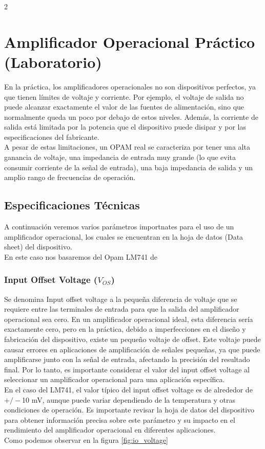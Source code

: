 \documentclass{article}
\begin{document}
\begin{multicols}{2}
 
\section{Amplificador Operacional Práctico (Laboratorio)}
En la práctica, los amplificadores operacionales no son dispositivos perfectos, ya que tienen límites de voltaje y corriente.
Por ejemplo, el voltaje de salida no puede alcanzar exactamente el valor de las fuentes de alimentación, sino que normalmente queda un poco por debajo de estos niveles.
Además, la corriente de salida está limitada por la potencia que el dispositivo puede disipar y por las especificaciones del fabricante.\\
A pesar de estas limitaciones, un OPAM real se caracteriza por tener una alta ganancia de voltaje, una impedancia de entrada muy grande (lo que evita consumir corriente de la señal de entrada), una baja impedancia de salida y un amplio rango de frecuencias de operación.



\subsection{Especificaciones Técnicas}
A continuación veremos varios parámetros importnates para el uso de un amplificador operacional, los cuales se encuentran en la hoja de datos (Data sheet) del dispositivo.\\
En este caso nos basaremos del Opam LM741 de 


\subsubsection{Input Offset Voltage ($V_{OS}$)}

Se denomina Input offset voltage a la pequeña diferencia de voltaje que se requiere entre las terminales de entrada para que la salida del amplificador operacional sea cero. En un amplificador operacional ideal, esta diferencia sería exactamente cero, pero en la práctica, debido a imperfecciones en el diseño y fabricación del dispositivo, existe un pequeño voltaje de offset. Este voltaje puede causar errores en aplicaciones de amplificación de señales pequeñas, ya que puede amplificarse junto con la señal de entrada, afectando la precisión del resultado final. Por lo tanto, es importante considerar el valor del input offset voltage al seleccionar un amplificador operacional para una aplicación específica.\\  
En el caso del LM741, el valor típico del input offset voltage es de alrededor de $+/-$10 mV, aunque puede variar dependiendo de la temperatura y otras condiciones de operación. Es importante revisar la hoja de datos del dispositivo para obtener información precisa sobre este parámetro y su impacto en el rendimiento del amplificador operacional en diferentes aplicaciones.\\
Como podemos observar en la figura \ref{fig:io_voltage} 


\end{multicols}
\end{document}
